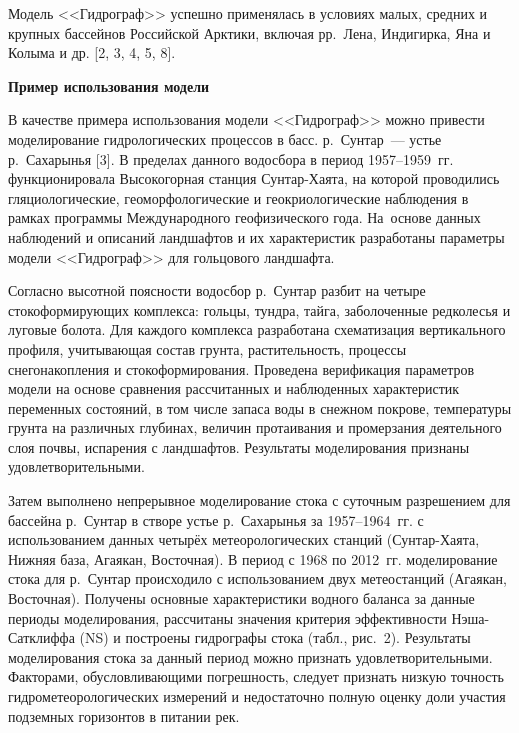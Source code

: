 Модель <<Гидрограф>> успешно применялась в условиях малых, средних и крупных бассейнов Российской Арктики, включая рр.~Лена, Индигирка, Яна и Колыма и др. [2, 3, 4, 5, 8].



\textbf{Пример использования модели}

В качестве примера использования модели <<Гидрограф>> можно привести моделирование гидрологических процессов в басс.  р.~Сунтар~--- устье р.~Сахарынья [3]. В пределах данного водосбора в период 1957--1959~гг. функционировала Высокогорная станция Сунтар-Хаята, на которой проводились гляциологические, геоморфологические и геокриологические наблюдения в рамках программы Международного геофизического года. На~основе данных наблюдений и описаний ландшафтов и их характеристик разработаны параметры модели <<Гидрограф>> для гольцового ландшафта.

Согласно высотной поясности водосбор р.~Сунтар разбит на четыре стокоформирующих комплекса: гольцы, тундра, тайга, заболоченные редколесья и луговые болота. Для каждого комплекса разработана схематизация вертикального профиля, учитывающая состав грунта, растительность, процессы снегонакопления и стокоформирования. Проведена верификация параметров модели на основе сравнения рассчитанных и наблюденных характеристик переменных состояний, в том числе запаса воды в снежном покрове, температуры грунта на различных глубинах, величин протаивания и промерзания деятельного слоя почвы, испарения с ландшафтов. Результаты моделирования признаны удовлетворительными.

Затем выполнено непрерывное моделирование стока с суточным разрешением для бассейна р.~Сунтар в створе устье р.~Сахарынья за 1957--1964~гг. с использованием данных четырёх метеорологических станций (Сунтар-Хаята, Нижняя база, Агаякан, Восточная). В период с 1968 по 2012~гг. моделирование стока для р.~Сунтар происходило с использованием двух метеостанций (Агаякан, Восточная). Получены основные характеристики водного баланса за данные периоды моделирования, рассчитаны значения критерия эффективности Нэша-Сатклиффа (NS) и построены гидрографы стока (табл., рис.~2). Результаты моделирования стока за данный период можно признать удовлетворительными. Факторами, обусловливающими погрешность, следует признать низкую точность гидрометеорологических измерений и недостаточно полную оценку доли участия подземных горизонтов в питании рек.



